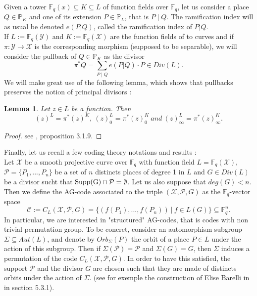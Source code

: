 \documentclass[10pt]{article}
\newtheorem{lem1}{Lemma}[]
\newcommand{\s}{\vspace{0.3cm}}
\newcommand{\cd}{\cdot}
\newcommand{\fq}{\mathbb{F}_q}
\newcommand{\su}{\subseteq}
\newcommand{\X}{\mathcal{X}}
\newcommand{\Y}{\mathcal{Y}}
\newcommand{\PR}{\mathcal{P}}
\begin{document}
\newpage

Given a tower $\fq(x) \su K \su L$ of function fields over $\fq$, let us consider a place  $Q \in \mathbb{P}_K$ and one of its extension $P \in \mathbb{P}_L$, that is $P \mid Q$. The ramification index will as usual be denoted $e(P|Q)$, called the ramification index of $P|Q$. \\
If $L := \fq(\Y)$ and $K:=\fq(\X)$ are the function fields of to curves and if $\pi : \Y \rightarrow \X$ is the corresponding morphism (supposed to be separable), we will consider the pullback of $Q \in \mathbb{P}_K$ as the divisor
\[\pi^*Q = \sum\limits_{P \mid Q} e(P|Q) \cd P \in Div(L).\]
We will make great use of the following lemma, which shows that pullbacks preserves the notion of principal divisors :

\s

\begin{lem1}
Let $z \in L$ be a function. Then 
\[(z)^L = \pi^*(z)^K, \ (z)^L_0 = \pi^*(z)_0^K \ and \ (z)^L_{\infty} = \pi^*(z)^K_{\infty}.\]
\end{lem1} 

\s

\begin{proof}
see \cite{Sti}, proposition 3.1.9.
\end{proof}

\s

Finally, let us recall a few coding theory notations and results : \\
 Let $\X$ be a smooth projective curve over $\fq$ with function field $L = \fq(\X)$, $\PR = \{P_1,...,P_n\}$ be a set of $n$ distincts places of degree 1 in $L$  and $G \in Div(L)$ be a divisor sucht that $\rm{Supp}(G) \cap \PR = \emptyset$. Let us also suppose that $deg(G)<n$. Then we define the AG-code associated to the triple $(\X,\PR,G)$ as the $\fq$-vector space
\[\mathcal{C} := C_L(\X,\PR,G) = \{ (f(P_1),...,f(P_n)) \ | \ f \in L(G)\} \su \fq^n.\]
In particular, we are interested in "structured" AG-codes, that is codes with non trivial permutation group. To be concret, consider an automorphism subgroup $\Sigma \su Aut(L)$, and denote by $Orb_{\Sigma}(P)$ the orbit of a place $P \in L$ under the action of this subgroup. Then if $\Sigma(\PR) = \PR$ and $\Sigma(G)=G$, then $\Sigma$ induces a permutation of the code $C_L(\X,\PR,G)$. In order to have this satisfied, the support $\PR$ and the divisor $G$ are chosen such that they are made of distincts orbits under the action of $\Sigma$. (see for exemple the construction of Elise Barelli in \cite{Bar} in section 5.3.1).
\end{document}
